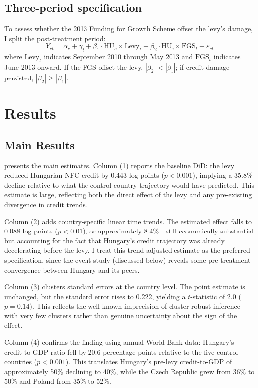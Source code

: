 \documentclass[12pt]{article}
\begin{document}
\subsection{Three-period specification}

To assess whether the 2013 Funding for Growth Scheme offset the levy's damage, I split the post-treatment period:
\begin{equation}
Y_{ct} = \alpha_c + \gamma_t + \beta_1 \cdot \text{HU}_c \times \text{Levy}_t + \beta_2 \cdot \text{HU}_c \times \text{FGS}_t + \varepsilon_{ct}
\end{equation}
where $\text{Levy}_t$ indicates September 2010 through May 2013 and $\text{FGS}_t$ indicates June 2013 onward. If the FGS offset the levy, $|\beta_2| < |\beta_1|$; if credit damage persisted, $|\beta_2| \geq |\beta_1|$.


\section{Results}

\subsection{Main Results}

 presents the main estimates. Column (1) reports the baseline DiD: the levy reduced Hungarian NFC credit by 0.443 log points ($p < 0.001$), implying a 35.8\% decline relative to what the control-country trajectory would have predicted. This estimate is large, reflecting both the direct effect of the levy and any pre-existing divergence in credit trends.

Column (2) adds country-specific linear time trends. The estimated effect falls to 0.088 log points ($p < 0.01$), or approximately 8.4\%---still economically substantial but accounting for the fact that Hungary's credit trajectory was already decelerating before the levy. I treat this trend-adjusted estimate as the preferred specification, since the event study (discussed below) reveals some pre-treatment convergence between Hungary and its peers.

Column (3) clusters standard errors at the country level. The point estimate is unchanged, but the standard error rises to 0.222, yielding a $t$-statistic of 2.0 ($p = 0.14$). This reflects the well-known imprecision of cluster-robust inference with very few clusters rather than genuine uncertainty about the sign of the effect.

Column (4) confirms the finding using annual World Bank data: Hungary's credit-to-GDP ratio fell by 20.6 percentage points relative to the five control countries ($p < 0.001$). This translates Hungary's pre-levy credit-to-GDP of approximately 50\% declining to 40\%, while the Czech Republic grew from 36\% to 50\% and Poland from 35\% to 52\%.
\end{document}

